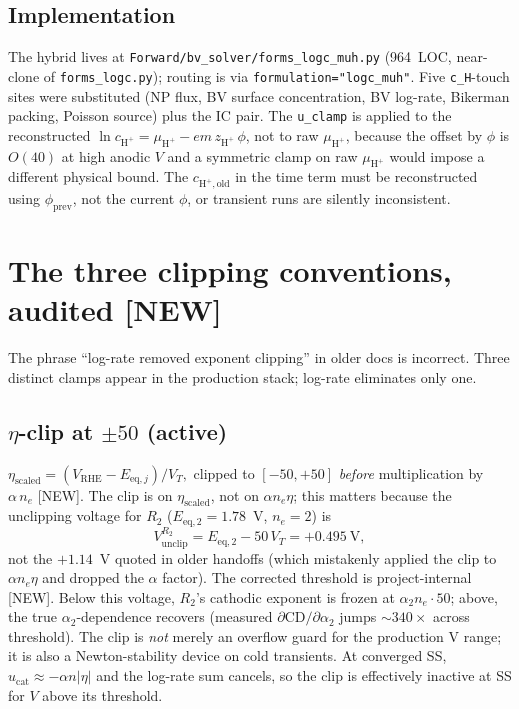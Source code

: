 \documentclass[11pt]{article}
\newcommand{\new}{\textcolor{red!70!black}{[NEW]}}
\newcommand{\Hp}{\text{H}^+}
\begin{document}
\subsection{Implementation}
The hybrid lives at \texttt{Forward/bv\_solver/forms\_logc\_muh.py}
(964~LOC, near-clone of \texttt{forms\_logc.py}); routing is via
\texttt{formulation="logc\_muh"}.  Five \texttt{c\_H}-touch sites
were substituted (NP flux, BV surface concentration, BV log-rate,
Bikerman packing, Poisson source) plus the IC pair.  The
\texttt{u\_clamp} is applied to the reconstructed
$\ln c_{\Hp} = \mu_{\Hp} - em\,z_{\Hp}\,\phi$, not to raw $\mu_{\Hp}$,
because the offset by $\phi$ is $O(40)$ at high anodic $V$ and a
symmetric clamp on raw $\mu_{\Hp}$ would impose a different physical
bound.  The $c_{\Hp,\mathrm{old}}$ in the time term must be
reconstructed using $\phi_{\mathrm{prev}}$, not the current $\phi$,
or transient runs are silently inconsistent.

\section{The three clipping conventions, audited \new}
\label{sec:clipping}

The phrase ``log-rate removed exponent clipping'' in older docs is
incorrect.  Three distinct clamps appear in the production stack;
log-rate eliminates only one.

\subsection{$\eta$-clip at $\pm 50$ (active)}
\(
  \eta_{\mathrm{scaled}}
   = (V_{\mathrm{RHE}}-E_{\mathrm{eq},j})/V_T,
\)
clipped to $[-50,+50]$ \emph{before} multiplication by $\alpha\,n_e$
\cite{forms_logc_py_217_236} \new{}.  The clip is on
$\eta_{\mathrm{scaled}}$, not on $\alpha n_e\eta$; this matters
because the unclipping voltage for $R_2$
($E_{\mathrm{eq},2}=1.78$~V, $n_e=2$) is
\begin{equation}
  V_{\mathrm{unclip}}^{R_2} = E_{\mathrm{eq},2} - 50\,V_T = +0.495~\text{V},
\end{equation}
not the $+1.14$~V quoted in older handoffs (which mistakenly applied
the clip to $\alpha n_e\eta$ and dropped the $\alpha$ factor).
The corrected threshold is project-internal \new{}.  Below this
voltage, $R_2$'s cathodic exponent is frozen at
$\alpha_2 n_e\cdot 50$; above, the true $\alpha_2$-dependence
recovers (measured $\partial$CD$/\partial\alpha_2$ jumps $\sim 340\times$
across threshold).
The clip is \emph{not} merely an overflow guard for the production V
range; it is also a Newton-stability device on cold transients.
At converged SS, $u_{\mathrm{cat}}\approx -\alpha n|\eta|$ and the
log-rate sum cancels, so the clip is effectively inactive at SS for
$V$ above its threshold.
\end{document}

